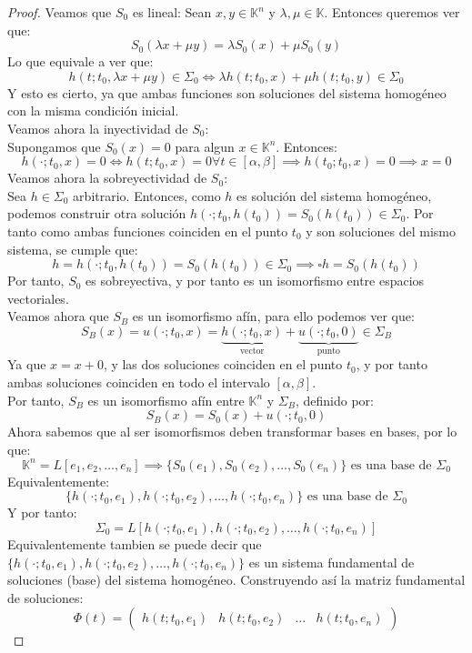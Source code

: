 \begin{proof}
    Veamos que $S_0$ es lineal:
    Sean $x,y \in \mathbb{K}^n$ y $\lambda, \mu \in \mathbb{K}$. Entonces queremos ver que:
    \[
        S_0(\lambda x + \mu y) = \lambda S_0(x) + \mu S_0(y)
    \]
    Lo que equivale a ver que:
    \[
        h(t; t_0, \lambda x + \mu y) \in \Sigma_0 \iff
        \lambda h(t; t_0, x) + \mu h(t; t_0, y) \in \Sigma_0
    \]
    Y esto es cierto, ya que ambas funciones son soluciones del sistema homogéneo con la misma condición inicial.\\
    Veamos ahora la inyectividad de $S_0$:\\
    Supongamos que $S_0(x) = 0$ para algun $x \in \mathbb{K}^n$. Entonces:
    \[
        h(\cdot; t_0, x) = 0 \iff
        h(t; t_0, x) = 0 \forall t \in [\alpha, \beta] \implies
        h(t_0; t_0, x) = 0 \implies
        x = 0
    \]
    Veamos ahora la sobreyectividad de $S_0$:\\
    Sea $h \in \Sigma_0$ arbitrario. Entonces, como $h$ es solución del sistema homogéneo, podemos construir otra solución $h(\cdot; t_0, h(t_0)) = S_0(h(t_0)) \in \Sigma_0$. Por tanto como ambas funciones coinciden en el punto $t_0$ y son soluciones del mismo sistema, se cumple que:
    \[
        h = h(\cdot; t_0, h(t_0)) = S_0(h(t_0)) \in \Sigma_0 \implies
        \square{h = S_0(h(t_0))}
    \]
    Por tanto, $S_0$ es sobreyectiva, y por tanto es un isomorfismo entre espacios vectoriales.\\
    Veamos ahora que $S_B$ es un isomorfismo afín, para ello podemos ver que:
    \[
        S_B(x) = u(\cdot; t_0, x) = \underbrace{h(\cdot; t_0, x)}_{\text{vector}} + \underbrace{u(\cdot; t_0, 0)}_{\text{punto}} \in \Sigma_B
    \]
    Ya que $x = x + 0$, y las dos soluciones coinciden en el punto $t_0$, y por tanto ambas soluciones coinciden en todo el intervalo $[\alpha, \beta]$.\\
    Por tanto, $S_B$ es un isomorfismo afín entre $\mathbb{K}^n$ y $\Sigma_B$, definido por:
    \[
        S_B(x) = S_0(x) + u(\cdot; t_0, 0)
    \]
    Ahora sabemos que al ser isomorfismos deben transformar bases en bases, por lo que:
    \[
    \mathbb{K}^n =
    L \left[ e_1, e_2, \ldots, e_n \right]
    \implies
    \{ S_0(e_1), S_0(e_2), \ldots, S_0(e_n) \}
    \text{ es una base de } \Sigma_0
    \]
    Equivalentemente:
    \[
    \{ h(\cdot; t_0, e_1), h(\cdot; t_0, e_2), \ldots, h(\cdot; t_0, e_n) \}
    \text{ es una base de } \Sigma_0
    \]
    Y por tanto:
    \[
        \Sigma_0 = L \left[ h(\cdot; t_0, e_1), h(\cdot; t_0, e_2), \ldots, h(\cdot; t_0, e_n) \right]
    \]
    Equivalentemente tambien se puede decir que $\{ h(\cdot; t_0, e_1), h(\cdot; t_0, e_2), \ldots, h(\cdot; t_0, e_n) \}$ es un sistema fundamental de soluciones (base) del sistema homogéneo.
    Construyendo así la matriz fundamental de soluciones:
    \[
        \Phi(t) =
        \begin{pmatrix}
            h(t; t_0, e_1) & h(t; t_0, e_2) & \ldots & h(t; t_0, e_n)
        \end{pmatrix}
    \]
\end{proof}

